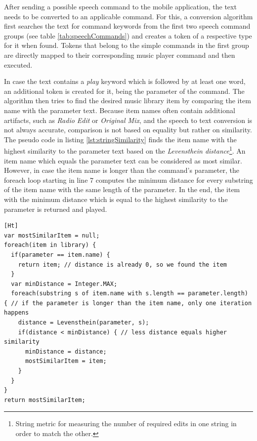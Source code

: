After sending a possible speech command to the mobile application, the text needs to be converted to an applicable command. For this, a conversion algorithm first searches the text for command keywords from the first two speech command groups (see table \ref{tab:speechCommands}) and creates a token of a respective type for it when found. Tokens that belong to the simple commands in the first group are directly mapped to their corresponding music player command and then executed. 

In case the text contains a \textit{play} keyword which is followed by at least one word, an additional token is created for it, being the parameter of the command. The algorithm then tries to find the desired music library item by comparing the item name with the parameter text. Because item names often contain additional artifacts, such as \textit{Radio Edit} or \textit{Original Mix}, and the speech to text conversion is not always accurate, comparison is not based on equality but rather on similarity. The pseudo code in listing \ref{lst:stringSimilarity} finds the item name with the highest similarity to the parameter text based on the \textit{Levensthein distance}\footnote{String metric for measuring the number of required edits in one string in order to match the other.}. An item name which equals the parameter text can be considered as most similar. However, in case the item name is longer than the command's parameter, the foreach loop starting in line 7 computes the minimum distance for every substring of the item name with the same length of the parameter. In the end, the item with the minimum distance which is equal to the highest similarity to the parameter is returned and played.

\newpage

\begin{lstlisting}[caption=Calculating parameter and music item name similarity, label=lst:stringSimilarity][Ht]
var mostSimilarItem = null;
foreach(item in library) {
  if(parameter == item.name) { 
    return item; // distance is already 0, so we found the item
  }
  var minDistance = Integer.MAX;
  foreach(substring s of item.name with s.length == parameter.length) { // if the parameter is longer than the item name, only one iteration happens
    distance = Levensthein(parameter, s);
    if(distance < minDistance) { // less distance equals higher similarity
      minDistance = distance;
      mostSimilarItem = item;
    }
  }
}
return mostSimilarItem;
\end{lstlisting}


